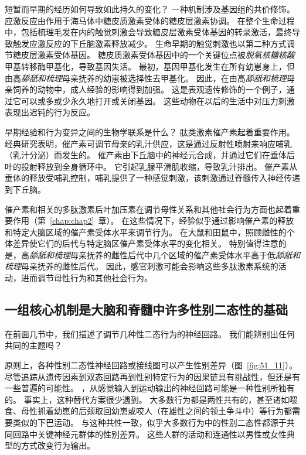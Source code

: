 短暂而早期的经历如何导致如此持久的变化？
一种机制涉及基因组的共价修饰。
应激反应由作用于海马体中糖皮质激素受体的糖皮层激素协调。
在整个生命过程中，包括梳理毛发在内的触觉刺激会导致糖皮层激素受体基因的转录激活，最终导致触发应激反应的下丘脑激素释放减少。
生命早期的触觉刺激也以第二种方式调节糖皮层激素受体基因。
糖皮质激素受体基因中的一个关键位点被\textit{脱氧核糖核酸}甲基转移酶甲基化，导致基因失活。
最初，基因甲基化发生在所有幼崽身上，但由高\textit{舔舐和梳理}母亲抚养的幼崽被选择性去甲基化。
因此，在由高\textit{舔舐和梳理}母亲饲养的动物中，成人经验的影响得到加强。
这是表观遗传修饰的一个例子，通过它可以或多或少永久地打开或关闭基因。
这些动物在以后的生活中对压力刺激表现出迟钝的行为反应。


早期经验和行为变异之间的生物学联系是什么？
肽类激素催产素起着重要作用。
经典研究表明，催产素可调节母亲的乳汁供应，这是通过反射性喷射来响应哺乳（乳汁分泌）而发生的。
催产素由下丘脑中的神经元合成，并通过它们在垂体后叶的投射释放到全身循环中。
它引起乳腺平滑肌收缩，导致乳汁排出。
催产素从垂体的释放受哺乳控制，哺乳提供了一种感觉刺激，该刺激通过脊髓传入神经传递到下丘脑。


催产素和相关的多肽激素后叶加压素在调节母性关系和其他社会行为方面也起着重要作用（第~\ref{chap:chap2}~章）。
在这些情况下，经验似乎通过影响催产素的释放和特定大脑区域的催产素受体水平来调节行为。
在大鼠和田鼠中，照顾雌性的个体差异使它们的后代与特定脑区催产素受体水平的变化相关。
特别值得注意的是，高\textit{舔舐和梳理}母亲抚养的雌性后代中几个区域的催产素受体水平高于低\textit{舔舐和梳理}母亲抚养的雌性后代。
因此，感官刺激可能会影响这些多肽激素系统的活动，进而调节母性行为和其他社会行为。



\subsection{一组核心机制是大脑和脊髓中许多性别二态性的基础}

在前面几节中，我们描述了调节几种性二态行为的神经回路。
我们能辨别出任何共同的主题吗？


原则上，各种性别二态性神经回路或接线图可以产生性别差异（图~\ref{fig:51_11}）。
尽管追踪从遗传因素到双态回路再到性别特定行为的因果链具有挑战性，但还是有一些普遍的可能性。 
，从感觉输入到运动输出的神经回路可能是一种性别所独有的。
事实上，这种替代方案很少遇到。
大多数行为都是两性共有的，甚至诸如喂食、母性抓着幼崽的后颈取回幼崽或咬人（在雄性之间的领土争斗中）等行为都需要类似的下巴运动。
与这种共性一致，似乎大多数行为中的性别二态性都源于共同回路中关键神经元群体的性别差异。
这些人群的活动和连通性以男性或女性典型的方式改变行为输出。



